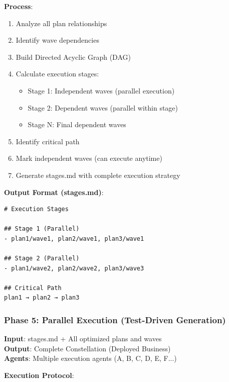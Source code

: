 \documentclass[12pt,letterpaper]{article}
\begin{document}
\textbf{Process}:
\begin{enumerate}
    \item Analyze all plan relationships
    \item Identify wave dependencies
    \item Build Directed Acyclic Graph (DAG)
    \item Calculate execution stages:
    \begin{itemize}
        \item Stage 1: Independent waves (parallel execution)
        \item Stage 2: Dependent waves (parallel within stage)
        \item Stage N: Final dependent waves
    \end{itemize}
    \item Identify critical path
    \item Mark independent waves (can execute anytime)
    \item Generate stages.md with complete execution strategy
\end{enumerate}

\textbf{Output Format (stages.md)}:
\begin{verbatim}
# Execution Stages

## Stage 1 (Parallel)
- plan1/wave1, plan2/wave1, plan3/wave1

## Stage 2 (Parallel)
- plan1/wave2, plan2/wave2, plan3/wave3

## Critical Path
plan1 → plan2 → plan3
\end{verbatim}

\subsubsection{Phase 5: Parallel Execution (Test-Driven Generation)}

\textbf{Input}: stages.md + All optimized plans and waves\\
\textbf{Output}: Complete Constellation (Deployed Business)\\
\textbf{Agents}: Multiple execution agents (A, B, C, D, E, F...)

\textbf{Execution Protocol}:
\end{document}
